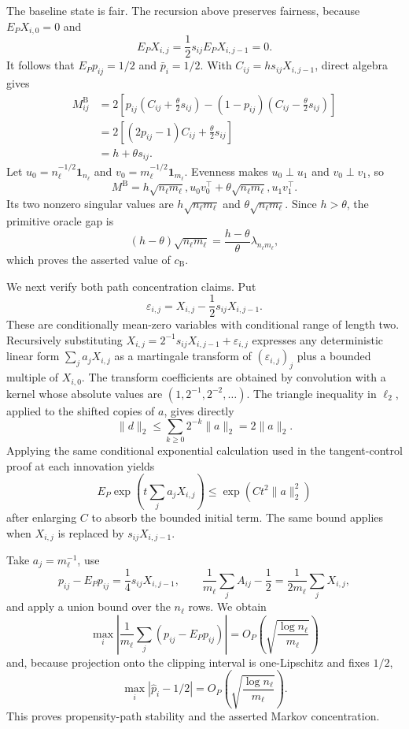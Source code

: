 The baseline state is fair.  The recursion above preserves fairness, because \(E_PX_{i,0}=0\) and
\[
 E_PX_{i,j}=\frac12s_{ij}E_PX_{i,j-1}=0.
\]
It follows that \(E_Pp_{ij}=1/2\) and \(\bar p_i=1/2\).  With \(C_{ij}=hs_{ij}X_{i,j-1}\), direct algebra gives
\[
 \begin{aligned}
 M^{\mathrm B}_{ij}
 &=2\left[p_{ij}\left(C_{ij}+\frac\theta2s_{ij}\right)
 -(1-p_{ij})\left(C_{ij}-\frac\theta2s_{ij}\right)\right]\\
 &=2\left[(2p_{ij}-1)C_{ij}+\frac\theta2s_{ij}\right]\\
 &=h+\theta s_{ij}.
 \end{aligned}
\]
Let \(u_0=n_\ell^{-1/2}\mathbf1_{n_\ell}\) and \(v_0=m_\ell^{-1/2}\mathbf1_{m_\ell}\).  Evenness makes \(u_0\perp u_1\) and \(v_0\perp v_1\), so
\[
 M^{\mathrm B}=h\sqrt{n_\ell m_\ell},u_0v_0^\top
 +\theta\sqrt{n_\ell m_\ell},u_1v_1^\top.
\]
Its two nonzero singular values are \(h\sqrt{n_\ell m_\ell}\) and \(\theta\sqrt{n_\ell m_\ell}\).  Since \(h>\theta\), the primitive oracle gap is
\[
 (h-\theta)\sqrt{n_\ell m_\ell}
 =\frac{h-\theta}{\theta}\lambda_{n_\ell m_\ell},
\]
which proves the asserted value of \(c_{\mathrm B}\).

We next verify both path concentration claims.  Put
\[
 \varepsilon_{i,j}=X_{i,j}-\frac12s_{ij}X_{i,j-1}.
\]
These are conditionally mean-zero variables with conditional range of length two.  Recursively substituting
\(X_{i,j}=2^{-1}s_{ij}X_{i,j-1}+\varepsilon_{i,j}\) expresses any deterministic linear form \(\sum_j a_jX_{i,j}\) as a martingale transform of \((\varepsilon_{i,j})_j\) plus a bounded multiple of \(X_{i,0}\).  The transform coefficients are obtained by convolution with a kernel whose absolute values are \((1,2^{-1},2^{-2},\ldots)\).  The triangle inequality in \(\ell_2\), applied to the shifted copies of \(a\), gives directly
\[
 \lVert d\rVert_2
 \le\sum_{k\ge0}2^{-k}\lVert a\rVert_2
 =2\lVert a\rVert_2.
\]
Applying the same conditional exponential calculation used in the tangent-control proof at each innovation yields
\[
 E_P\exp\!\left(t\sum_ja_jX_{i,j}\right)
 \le \exp(Ct^2\lVert a\rVert_2^2)
\]
after enlarging \(C\) to absorb the bounded initial term.  The same bound applies when \(X_{i,j}\) is replaced by \(s_{ij}X_{i,j-1}\).

Take \(a_j=m_\ell^{-1}\), use
\[
 p_{ij}-E_Pp_{ij}=\frac14s_{ij}X_{i,j-1},
 \qquad
 \frac1{m_\ell}\sum_jA_{ij}-\frac12
 =\frac1{2m_\ell}\sum_jX_{i,j},
\]
and apply a union bound over the \(n_\ell\) rows.  We obtain
\[
 \max_i\left|\frac1{m_\ell}\sum_j(p_{ij}-E_Pp_{ij})\right|
 =O_P\!\left(\sqrt{\frac{\log n_\ell}{m_\ell}}\right)
\]
and, because projection onto the clipping interval is one-Lipschitz and fixes \(1/2\),
\[
 \max_i|\widehat p_i-1/2|
 =O_P\!\left(\sqrt{\frac{\log n_\ell}{m_\ell}}\right).
\]
This proves propensity-path stability and the asserted Markov concentration.

